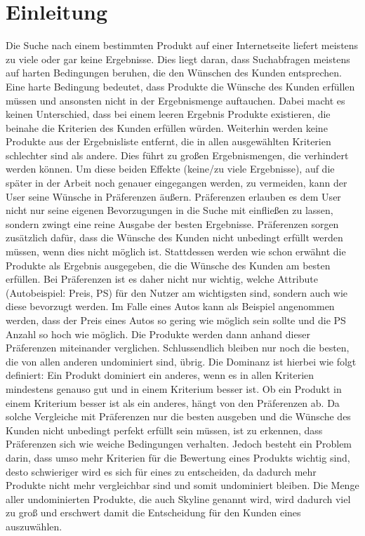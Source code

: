 \chapter{Einleitung}
\label{ch:Einleitung}
Die Suche nach einem bestimmten Produkt auf einer Internetseite liefert meistens zu viele oder gar keine Ergebnisse.  Dies liegt daran, dass Suchabfragen meistens auf harten Bedingungen beruhen, die den Wünschen des Kunden entsprechen. Eine harte Bedingung bedeutet, dass Produkte die Wünsche des Kunden erfüllen müssen und ansonsten nicht in der Ergebnismenge auftauchen. Dabei macht es keinen Unterschied, dass bei einem leeren Ergebnis Produkte existieren, die beinahe die Kriterien des Kunden erfüllen würden. Weiterhin werden keine Produkte aus der Ergebnisliste entfernt, die in allen ausgewählten Kriterien schlechter sind als andere. Dies führt zu großen Ergebnismengen, die verhindert werden können. Um diese beiden Effekte (keine/zu viele Ergebnisse), auf die später in der Arbeit noch genauer eingegangen werden, zu vermeiden, kann der User seine Wünsche in Präferenzen äußern. Präferenzen erlauben es dem User nicht nur seine eigenen Bevorzugungen in die Suche mit einfließen zu lassen, sondern zwingt eine reine Ausgabe der besten Ergebnisse. Präferenzen sorgen zusätzlich dafür, dass die Wünsche des Kunden nicht unbedingt erfüllt werden müssen, wenn dies nicht möglich ist. Stattdessen werden wie schon erwähnt die Produkte als Ergebnis ausgegeben, die die Wünsche des Kunden am besten erfüllen.
Bei Präferenzen ist es daher nicht nur wichtig, welche Attribute (Autobeispiel: Preis, PS) für den Nutzer am wichtigsten sind, sondern auch wie diese bevorzugt werden. Im Falle eines Autos kann als Beispiel angenommen werden, dass der Preis eines Autos so gering wie möglich sein sollte und die PS Anzahl so hoch wie möglich.
Die Produkte werden dann anhand dieser Präferenzen miteinander verglichen. Schlussendlich bleiben nur noch die besten, die von allen anderen undominiert sind, übrig. Die Dominanz ist hierbei wie folgt definiert: Ein Produkt dominiert ein anderes, wenn es in allen Kriterien mindestens genauso gut und in einem Kriterium besser ist. Ob ein Produkt in einem Kriterium besser ist als ein anderes, hängt von den Präferenzen ab. Da solche Vergleiche mit Präferenzen nur die besten ausgeben und die Wünsche des Kunden nicht unbedingt perfekt erfüllt sein müssen, ist zu erkennen, dass Präferenzen sich wie weiche Bedingungen verhalten.
Jedoch besteht ein Problem darin, dass umso mehr Kriterien für die Bewertung eines Produkts wichtig sind, desto schwieriger wird es sich für eines zu entscheiden, da dadurch mehr Produkte nicht mehr vergleichbar  sind und somit undominiert bleiben. Die Menge aller undominierten Produkte, die auch Skyline genannt wird, wird dadurch viel zu groß und erschwert damit die Entscheidung für den Kunden eines auszuwählen. 
